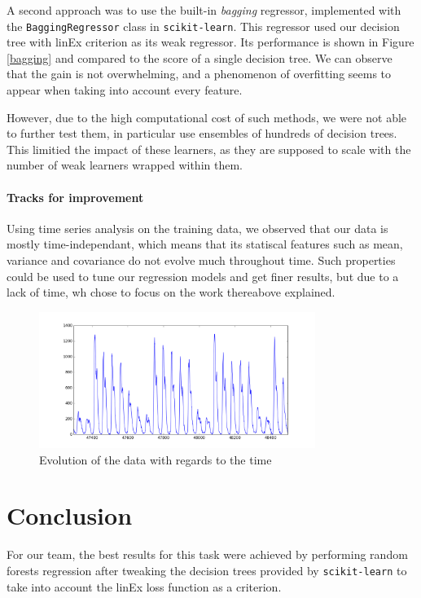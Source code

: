 \documentclass[a4paper,10pt]{article}
\begin{document}
  A second approach was to use the built-in \emph{bagging} regressor, implemented with the {\tt BaggingRegressor} class in {\tt scikit-learn}. This regressor used our decision tree with linEx criterion as its weak regressor. Its performance is shown in Figure \ref{bagging} and compared to the score of a single decision tree. We can observe that the gain is not overwhelming, and a phenomenon of overfitting seems to appear when taking into account every feature.

  However, due to the high computational cost of such methods, we were not able to further test them, in particular use ensembles of hundreds of decision trees. This limitied the impact of these learners, as they are supposed to scale with the number of weak learners wrapped within them.

  \subsection{Tracks for improvement}

  Using time series analysis on the training data, we observed that our data is mostly time-independant, which means that its statiscal features such as mean, variance and covariance do not evolve much throughout time. Such properties could be used to tune our regression models and get finer results, but due to a lack of time, wh chose to focus on the work thereabove explained.

  \begin{figure}
    \centering
    \includegraphics[width=0.8\textwidth]{graphics/3-Time_series.png}
    \caption{Evolution of the data with regards to the time}
    \label{time_series}
  \end{figure}

\part{Conclusion}

  For our team, the best results for this task were achieved by performing random forests regression after tweaking the decision trees provided by {\tt scikit-learn} to take into account the linEx loss function as a criterion.
\end{document}
